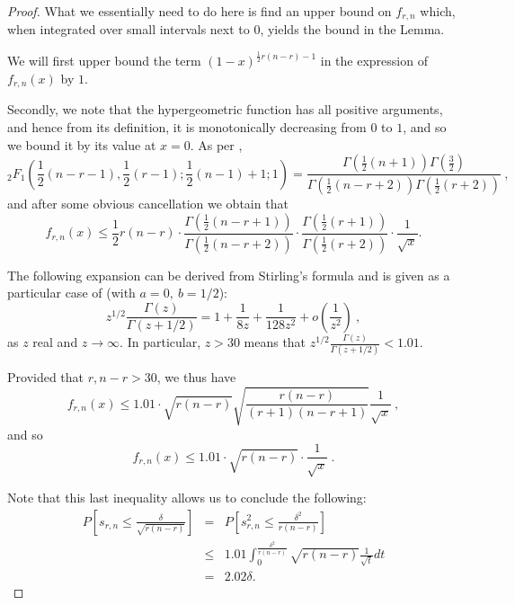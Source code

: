 \documentclass{article}
\newcommand{\red}[1]{\textcolor{red}{#1}}
\theoremstyle{definition}
\newcommand{\smin}{s_{r,n}}
\newcommand{\fmin}{f_{r,n}}
\begin{document}
\begin{proof} 

What we essentially need to do here is find an upper bound on $\fmin$ which, when integrated over small intervals next to $0$, yields the bound in the Lemma.

We will first upper bound the term $(1-x)^{\frac{1}{2}r(n-r)-1}$ in the expression of $\fmin(x)$ by $1$.

Secondly, we note that the hypergeometric function has all positive arguments, and hence from its definition, it is  monotonically decreasing from $0$ to $1$, and so we bound it by its value at $x=0$. As per \cite[Formula 15.1.20]{Abr_Steg}, 
\[
_{2}F_{1} \left ( \frac{1}{2}(n-r-1), \frac{1}{2}(r-1); \frac{1}{2}(n-1)+1; 1\right) = \frac{\Gamma \left (\frac{1}{2} (n+1) \right) \Gamma\left(\frac{3}{2}\right)}{\Gamma \left ( \frac{1}{2}(n-r+2)\right) \Gamma \left ( \frac{1}{2} (r+2) \right) }~,
\]
and after some obvious cancellation we obtain that 
\[
\fmin(x) \leq \frac{1}{2} r(n-r) \cdot \frac{\Gamma \left ( \frac{1}{2}(n-r+1)\right)}{\Gamma \left (\frac{1}{2}(n-r+2)\right)} \cdot \frac{\Gamma \left(\frac{1}{2}(r+1)\right)}{\Gamma \left ( \frac{1}{2} (r+2)\right)} \cdot \frac{1}{\sqrt{x}}.
\]

The following expansion can be derived from Stirling's formula and is given as a particular case of \cite[Formula 6.1.47]{Abr-Steg} (with $a = 0,~b = 1/2$):
\[
z^{1/2} \frac{\Gamma(z)}{\Gamma(z+ 1/2)} = 1 + \frac{1}{8z} + \frac{1}{128z^2} + o\left(\frac{1}{z^2}\right)~,
\]
as $z$ real and $z \rightarrow \infty$. 
In particular, $z>30$ means that $z^{1/2} \frac{\Gamma(z)}{\Gamma(z+ 1/2)} < 1.01$. %

Provided that $r, n-r >30$, we thus have
\[
\fmin(x) \leq 1.01 \cdot \sqrt{ r(n-r)} \sqrt{\frac{r(n-r)}{(r+1)(n-r+1)}} \frac{1}{\sqrt{x}}~,
\]
and so
\[
\fmin(x) \leq 1.01  \cdot \sqrt{ r(n-r)}  \cdot \frac{1}{\sqrt{x}}~.
\]

Note that this last inequality allows us to conclude the following:
\begin{eqnarray*}
P\left [ \smin \leq \frac{\delta}{\sqrt{r(n-r)}} \right] & = & P\left [ \smin^2 \leq \frac{\delta^2}{r(n-r)} \right] \\
& \leq &  1.01 \int_0^{\frac{\delta^2}{r(n-r)}} \sqrt{r(n-r)} \frac{1}{\sqrt{t}} dt  \\
& = &  2.02 \delta. 
\end{eqnarray*}

\end{proof}
\end{document}
